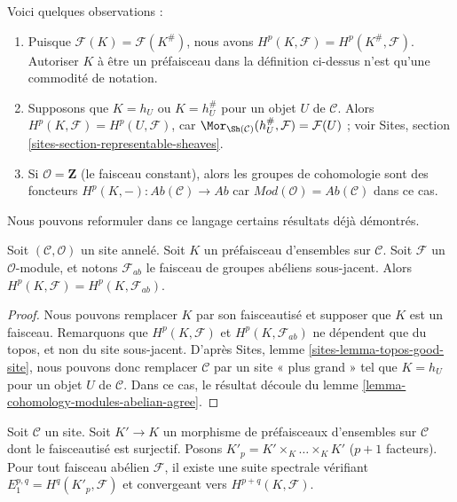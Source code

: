\medskip\noindent
Voici quelques observations :
\begin{enumerate}
\item Puisque $\mathcal{F}(K) = \mathcal{F}(K^\#)$, nous avons
$H^p(K, \mathcal{F}) = H^p(K^\#, \mathcal{F})$.
Autoriser $K$ à être un préfaisceau dans la définition ci-dessus n'est qu'une
commodité de notation.
\item Supposons que $K = h_U$ ou $K = h_U^\#$ pour un objet $U$ de
$\mathcal{C}$. Alors $H^p(K, \mathcal{F}) = H^p(U, \mathcal{F})$, car
$\Mor_{\Sh(\mathcal{C})}(h_U^\#, \mathcal{F}) = \mathcal{F}(U)$ ; voir
Sites, section \ref{sites-section-representable-sheaves}.
\item Si $\mathcal{O} = \mathbf{Z}$ (le faisceau constant), alors les groupes
de cohomologie sont des foncteurs
$H^p(K, - ) : \textit{Ab}(\mathcal{C}) \to \textit{Ab}$
car $\textit{Mod}(\mathcal{O}) = \textit{Ab}(\mathcal{C})$ dans ce cas.
\end{enumerate}
Nous pouvons reformuler dans ce langage certains résultats déjà démontrés.

\begin{lemma}
\label{lemma-compute-cohomology-on-sheaf-sets}
Soit $(\mathcal{C}, \mathcal{O})$ un site annelé.
Soit $K$ un préfaisceau d'ensembles sur $\mathcal{C}$.
Soit $\mathcal{F}$ un $\mathcal{O}$-module, et notons $\mathcal{F}_{ab}$ le
faisceau de groupes abéliens sous-jacent. Alors
$H^p(K, \mathcal{F}) = H^p(K, \mathcal{F}_{ab})$.
\end{lemma}

\begin{proof}
Nous pouvons remplacer $K$ par son faisceautisé et supposer que $K$ est un
faisceau. Remarquons que $H^p(K, \mathcal{F})$ et
$H^p(K, \mathcal{F}_{ab})$ ne dépendent que du topos, et non du site
sous-jacent. D'après Sites, lemme \ref{sites-lemma-topos-good-site}, nous
pouvons donc remplacer $\mathcal{C}$ par un site « plus grand » tel que
$K = h_U$ pour un objet $U$ de $\mathcal{C}$. Dans ce cas, le résultat découle
du lemme \ref{lemma-cohomology-modules-abelian-agree}.
\end{proof}

\begin{lemma}
\label{lemma-cech-to-cohomology-sheaf-sets}
Soit $\mathcal{C}$ un site. Soit $K' \to K$ un morphisme de préfaisceaux
d'ensembles sur $\mathcal{C}$ dont le faisceautisé est surjectif. Posons
$K'_p = K' \times_K \ldots \times_K K'$ ($p + 1$ facteurs).
Pour tout faisceau abélien $\mathcal{F}$, il existe une suite spectrale
vérifiant $E_1^{p, q} = H^q(K'_p, \mathcal{F})$ et convergeant vers
$H^{p + q}(K, \mathcal{F})$.
\end{lemma}

